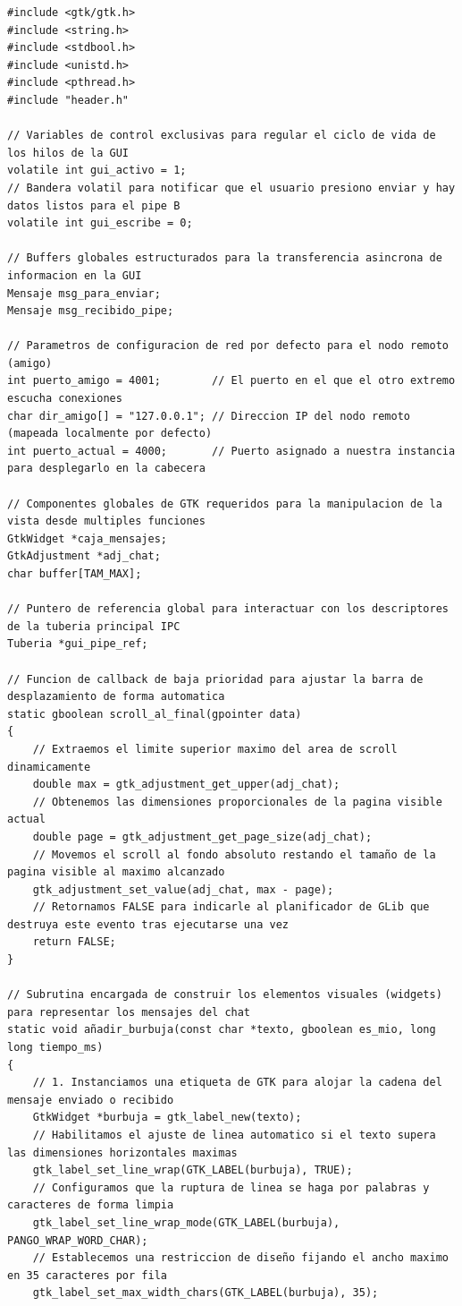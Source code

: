 \begin{lstlisting}[style=estiloC, caption={Archivo del Front-End (conexion P2P)}]
#include <gtk/gtk.h>
#include <string.h>
#include <stdbool.h>
#include <unistd.h>
#include <pthread.h>
#include "header.h"

// Variables de control exclusivas para regular el ciclo de vida de los hilos de la GUI
volatile int gui_activo = 1;
// Bandera volatil para notificar que el usuario presiono enviar y hay datos listos para el pipe B
volatile int gui_escribe = 0;

// Buffers globales estructurados para la transferencia asincrona de informacion en la GUI
Mensaje msg_para_enviar;
Mensaje msg_recibido_pipe;

// Parametros de configuracion de red por defecto para el nodo remoto (amigo)
int puerto_amigo = 4001;        // El puerto en el que el otro extremo escucha conexiones
char dir_amigo[] = "127.0.0.1"; // Direccion IP del nodo remoto (mapeada localmente por defecto)
int puerto_actual = 4000;       // Puerto asignado a nuestra instancia para desplegarlo en la cabecera

// Componentes globales de GTK requeridos para la manipulacion de la vista desde multiples funciones
GtkWidget *caja_mensajes;
GtkAdjustment *adj_chat;
char buffer[TAM_MAX];

// Puntero de referencia global para interactuar con los descriptores de la tuberia principal IPC
Tuberia *gui_pipe_ref;

// Funcion de callback de baja prioridad para ajustar la barra de desplazamiento de forma automatica
static gboolean scroll_al_final(gpointer data)
{
    // Extraemos el limite superior maximo del area de scroll dinamicamente
    double max = gtk_adjustment_get_upper(adj_chat);
    // Obtenemos las dimensiones proporcionales de la pagina visible actual
    double page = gtk_adjustment_get_page_size(adj_chat);
    // Movemos el scroll al fondo absoluto restando el tamaño de la pagina visible al maximo alcanzado
    gtk_adjustment_set_value(adj_chat, max - page);
    // Retornamos FALSE para indicarle al planificador de GLib que destruya este evento tras ejecutarse una vez
    return FALSE;
}

// Subrutina encargada de construir los elementos visuales (widgets) para representar los mensajes del chat
static void añadir_burbuja(const char *texto, gboolean es_mio, long long tiempo_ms)
{
    // 1. Instanciamos una etiqueta de GTK para alojar la cadena del mensaje enviado o recibido
    GtkWidget *burbuja = gtk_label_new(texto);
    // Habilitamos el ajuste de linea automatico si el texto supera las dimensiones horizontales maximas
    gtk_label_set_line_wrap(GTK_LABEL(burbuja), TRUE);
    // Configuramos que la ruptura de linea se haga por palabras y caracteres de forma limpia
    gtk_label_set_line_wrap_mode(GTK_LABEL(burbuja), PANGO_WRAP_WORD_CHAR);
    // Establecemos una restriccion de diseño fijando el ancho maximo en 35 caracteres por fila
    gtk_label_set_max_width_chars(GTK_LABEL(burbuja), 35);


\end{lstlisting}
